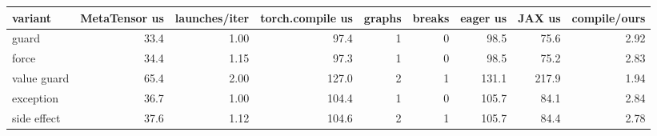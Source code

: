 \begin{tabular}{lrrrrrrrr}
\toprule
variant & MetaTensor us & launches/iter & torch.compile us & graphs & breaks & eager us & JAX us & compile/ours \\
\midrule
guard & 33.4 & 1.00 & 97.4 & 1 & 0 & 98.5 & 75.6 & 2.92 \\
force & 34.4 & 1.15 & 97.3 & 1 & 0 & 98.5 & 75.2 & 2.83 \\
value guard & 65.4 & 2.00 & 127.0 & 2 & 1 & 131.1 & 217.9 & 1.94 \\
exception & 36.7 & 1.00 & 104.4 & 1 & 0 & 105.7 & 84.1 & 2.84 \\
side effect & 37.6 & 1.12 & 104.6 & 2 & 1 & 105.7 & 84.4 & 2.78 \\
\bottomrule
\end{tabular}
